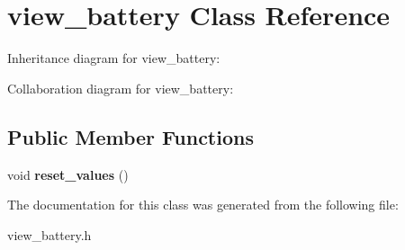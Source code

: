 \hypertarget{classview__battery}{}\section{view\+\_\+battery Class Reference}
\label{classview__battery}


Inheritance diagram for view\+\_\+battery\+:


Collaboration diagram for view\+\_\+battery\+:
\subsection*{Public Member Functions}
\begin{DoxyCompactItemize}
\item 
void {\bfseries reset\+\_\+values} ()\hypertarget{classview__battery_a54504ed9dda6e3d14889a6b686fc2f24}{}\label{classview__battery_a54504ed9dda6e3d14889a6b686fc2f24}

\end{DoxyCompactItemize}


The documentation for this class was generated from the following file\+:\begin{DoxyCompactItemize}
\item 
view\+\_\+battery.\+h\end{DoxyCompactItemize}
